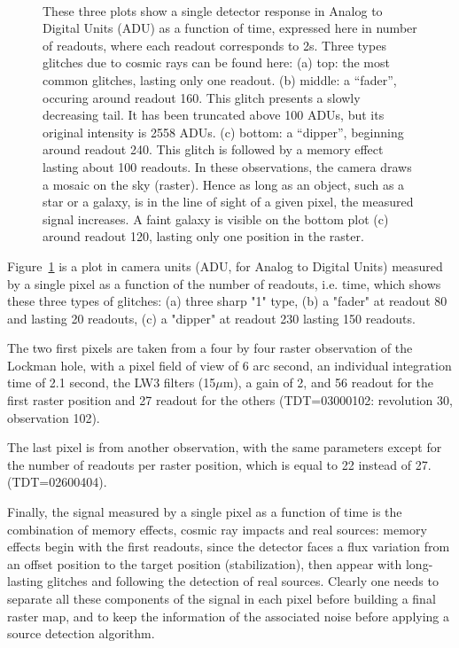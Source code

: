 \begin{figure}[htb]
\centerline{
\hbox{
}}
\caption{These three plots show a single detector response in Analog to
Digital Units (ADU) as a function of time, expressed here in number of
readouts,  where each readout corresponds to 2s. Three types glitches 
due to cosmic rays can be found here:
(a) top: the most common glitches, lasting only one readout. (b)
middle: a ``fader'', occuring around readout 160. This glitch presents a slowly
decreasing tail. It has been truncated above 100 ADUs, but its original
intensity is 2558 ADUs.  (c) bottom: a ``dipper'', beginning around readout
240. This glitch is followed by a memory effect lasting about 100 readouts.
In these observations, the camera draws a mosaic on the sky (raster). Hence as
long as an object, such as a star or a galaxy, is in the line of sight of
a given pixel, the measured signal increases.  A faint galaxy is visible 
on the bottom plot (c) around readout 120, lasting only one position
in the raster.}

\label{fig_glitch3}
\end{figure}



Figure~\ref{fig_glitch3} is 
a plot in camera units (ADU, for Analog to Digital Units) measured 
by a single pixel as a function of the number of readouts, i.e.  time, 
which shows these three types of glitches: (a) three sharp "1" type, (b)
 a "fader" at readout 80 and lasting 20 
readouts, (c) a "dipper" at readout 230 lasting 150 readouts.  

The two first pixels are taken from a four by four raster observation of the
Lockman hole, with a 
pixel field of view of 6 arc second, an individual integration time 
of 2.1 second,
the LW3 filters (15$\mu$m), a gain of 2, and 56 readout for the first raster
position and 27 readout for the others 
(TDT=03000102: revolution 30, observation 102).

The last pixel is from another observation, with the same parameters except for
the number of readouts per raster position, which is equal to 22 instead of 27.
(TDT=02600404).
 
Finally, the signal measured by a single pixel as a function of time
is the combination of memory effects, cosmic ray impacts and real
sources: memory effects begin with the first readouts, since the
detector faces a flux variation from an offset position to the target
position (stabilization), then appear with long-lasting glitches and
following the detection of real sources. Clearly one needs to
 separate all these
components of the signal in each pixel before building a final
raster map, and to keep the information of the associated noise before
applying a source detection algorithm.  

